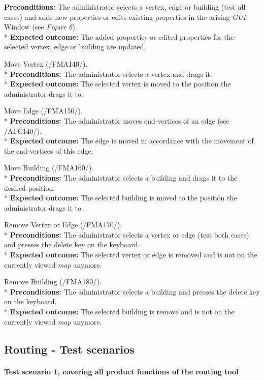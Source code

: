 \begin{numerate}[ATC]
	\textbf{Preconditions:} The administrator selects a vertex, edge or building (test all cases) and adds new properties or edits existing properties in the arising \textit{GUI} Window (see \emph{Figure 6}). \\*
	\textbf{Expected outcome:} The added properties or edited properties for the selected vertex, edge or building are updated.
\item Move Vertex (/FMA140/). \\*
	\textbf{Preconditions:} The administrator selects a vertex and drags it. \\*
	\textbf{Expected outcome:} The selected vertex is moved to the position the administrator drags it to.
\item Move Edge (/FMA150/). \\*
	\textbf{Preconditions:} The administrator moves end-vertices of an edge (see /ATC140/).\\*
	\textbf{Expected outcome:} The edge is moved in accordance with the movement of the end-vertices of this edge.
\item Move Building (/FMA160/). \\*
	\textbf{Preconditions:} The administrator selects a building and drags it to the desired position. \\*
	\textbf{Expected outcome:} The selected building is moved to the position the administrator drags it to.
\item Remove Vertex or Edge (/FMA170/). \\*
	\textbf{Preconditions:} The administrator selects a vertex or edge (test both cases) and presses the delete key on the keyboard.\\*
	\textbf{Expected outcome:} The selected vertex or edge is removed and is not on the currently viewed \textit{map} anymore.
\item Remove Building (/FMA180/). \\*
	\textbf{Preconditions:} The administrator selects a building and presses the delete key on the keyboard. \\*
	\textbf{Expected outcome:} The selected building is remove and is not on the currently viewed \textit{map} anymore.
\end{numerate}

\subsection{Routing - Test scenarios}

\paragraph{Test scenario 1, covering all product functions of the routing tool} ~\\

